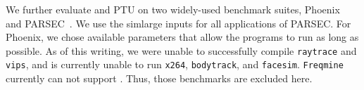 \begin{table}
\centering
{}
\caption{False sharing detection results using PTU and \sheriffdetect{}. \sheriffdetect{} correctly reports only actual false sharing instances that have performance impact;
\cmark{} indicates a correct report and \xmark{} indicates a false alarm. 
\label{table:microbenchmarks}}
\end{table}

We further evaluate \SheriffDetect{} and PTU on two widely-used benchmark suites, Phoenix~\cite{phoenix-hpca} and PARSEC~\cite{parsec}. We use the simlarge inputs for all applications of PARSEC. For Phoenix, we chose available parameters that allow the programs to run as long as possible. As of this writing, we were unable to successfully compile \texttt{raytrace} and \texttt{vips}, and \sheriff{} is
currently unable to run \texttt{x264}, \texttt{bodytrack},
and \texttt{facesim}. \texttt{Freqmine} currently can not support \pthreads{}. Thus, those benchmarks are excluded here. 
 
